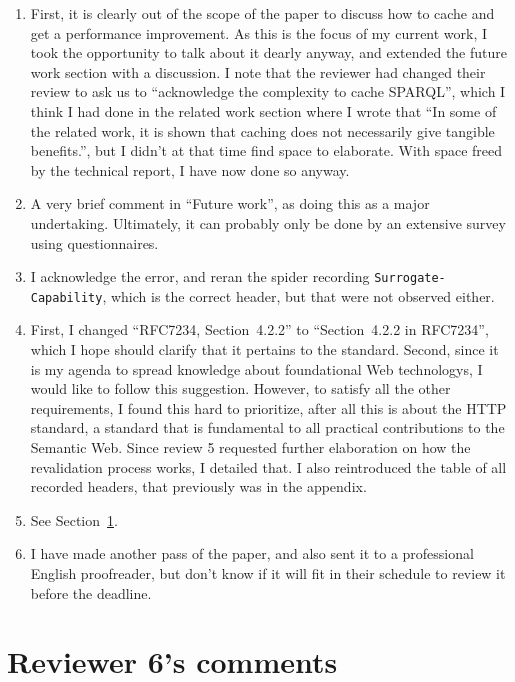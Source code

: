 \documentclass{article}
\newcommand{\httph}[1]{\texttt{#1}}
\begin{document}
\begin{enumerate}
\item First, it is clearly out of the scope of the paper to discuss
  how to cache and get a performance improvement. As this is the focus
  of my current work, I took the opportunity to talk about it dearly
  anyway, and extended the future work section with a discussion. I
  note that the reviewer had changed their review to ask us to
  ``acknowledge the complexity to cache SPARQL'', which I think I had
  done in the related work section where I wrote that ``In some of the
  related work, it is shown that caching does not necessarily give
  tangible benefits.'', but I didn't at that time find space to
  elaborate. With space freed by the technical report, I have now done
  so anyway.

\item A very brief comment in ``Future work'', as doing this as a
  major undertaking. Ultimately, it can probably only be done by an
  extensive survey using questionnaires.

\item I acknowledge the error, and reran the spider recording
  \httph{Surrogate-Capability}, which is the correct header, but that
  were not observed either.

\item First, I changed ``RFC7234, Section~4.2.2'' to ``Section~4.2.2
  in RFC7234'', which I hope should clarify that it pertains to the
  standard. Second, since it is my agenda to spread knowledge about
  foundational Web technologys, I would like to follow this
  suggestion. However, to satisfy all the other requirements, I found
  this hard to prioritize, after all this is about the HTTP standard,
  a standard that is fundamental to all practical contributions to the
  Semantic Web. Since review 5 requested further elaboration on how
  the revalidation process works, I detailed that. I also reintroduced
  the table of all recorded headers, that previously was in the
  appendix.

\item See Section~\ref{rev6}.

\item I have made another pass of the paper, and also sent it to a
  professional English proofreader, but don't know if it will fit in
  their schedule to review it before the deadline.

\end{enumerate}

\section{Reviewer 6's comments}\label{rev6}
\end{document}
